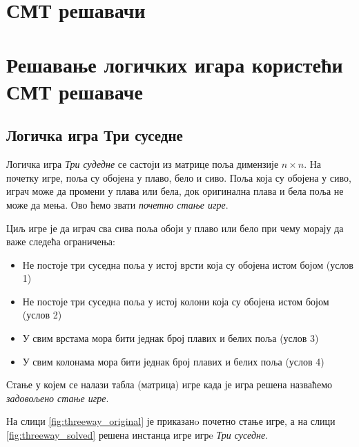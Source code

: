 \documentclass[a4paper]{article}
\begin{document}
\section{СМТ решавачи}

\section{Решавање логичких игара користећи СМТ решаваче}

\subsection{Логичка игра Три суседне}
Логичка игра \emph{Три судедне} се састоји из матрице поља димензије $n \times n$. На почетку игре,
поља су обојена у плаво, бело и сиво. Поља која су обојена у сиво, играч може да промени у плава или бела,
док оригинална плава и бела поља не може да мења. Ово ћемо звати \emph{почетно стање игре}.

Циљ игре је да играч сва сива поља обоји у плаво или бело при чему морају да важе следећа ограничења:
\begin{itemize}
    \item Не постоје три суседна поља у истој врсти која су обојена истом бојом (услов 1)
    \item Не постоје три суседна поља у истој колони која су обојена истом бојом (услов 2)
    \item У свим врстама мора бити једнак број плавих и белих поља (услов 3)
    \item У свим колонама мора бити једнак број плавих и белих поља (услов 4)
\end{itemize}

Стање у којем се налази табла (матрица) игре када је игра решена назваћемо \emph{задовољено стање игре}. 

На слици \ref{fig:threeway_original} је приказанo почетно стање игре, а на слици \ref{fig:threeway_solved} решена инстанца игре игрe \emph{Три суседне}.
\end{document}

